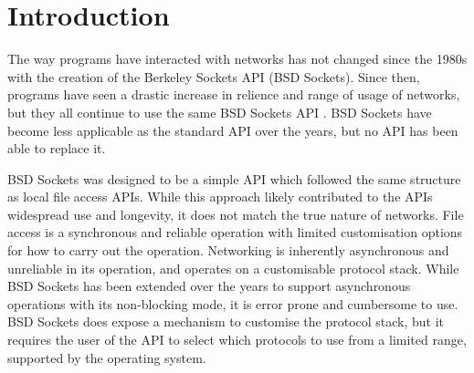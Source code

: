 \documentclass{l4proj}
\begin{document}
\tableofcontents

%
%
%
%
%
%
%
%
\chapter{Introduction}\label{ch:introduction}


The way programs have interacted with networks has not changed since the 1980s with the creation of the Berkeley Sockets
API (BSD Sockets).
Since then, programs have seen a drastic increase in relience and range of usage of networks, but they all continue to
use the same BSD Sockets API .
BSD Sockets have become less applicable as the standard API over the years, but no API has been able to replace it.

BSD Sockets was designed to be a simple API which followed the same structure as local file access APIs.
While this approach likely contributed to the APIs widespread use and longevity, it does not match the true nature of
networks.
File access is a synchronous and reliable operation with limited customisation options for how to carry out the
operation.
Networking is inherently asynchronous and unreliable in its operation, and operates on a customisable protocol stack.
While BSD Sockets has been extended over the years to support asynchronous operations with its non-blocking mode, it is
error prone and cumbersome to use.
BSD Sockets does expose a mechanism to customise the protocol stack, but it requires the user of the API to select which
protocols to use from a limited range, supported by the operating system.
\end{document}
